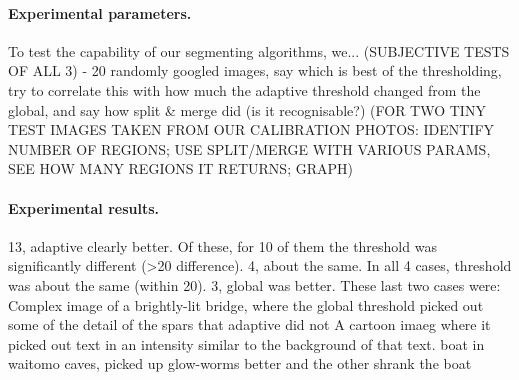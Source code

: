 \paragraph{Experimental parameters.}
To test the capability of our segmenting algorithms, we...
(SUBJECTIVE TESTS OF ALL 3) - 20 randomly googled images, say which is best of the thresholding, try to correlate this with how much the adaptive threshold changed from the global, and say how split \& merge did (is it recognisable?)
(FOR TWO TINY TEST IMAGES TAKEN FROM OUR CALIBRATION PHOTOS: IDENTIFY NUMBER OF REGIONS; USE SPLIT/MERGE WITH VARIOUS PARAMS, SEE HOW MANY REGIONS IT RETURNS; GRAPH)

\paragraph{Experimental results.}
13, adaptive clearly better. Of these, for 10 of them the threshold was significantly different (>20 difference). 4, about the same. In all 4 cases, threshold was about the same (within 20). 3, global was better. These last two cases were:
 Complex image of a brightly-lit bridge, where the global threshold picked out some of the detail of the spars that adaptive did not
A cartoon imaeg where it picked out text in an intensity similar to the background of that text.
boat in waitomo caves, picked up glow-worms better and the other shrank the boat









